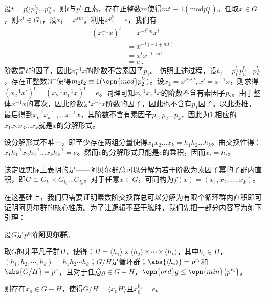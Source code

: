 设$t=p_2^{l_2}p_3^{l_3}...p_k^{l_k}$，则$t$与$p_1^{l_1}$互素，存在正整数$m$使得$mt\equiv 1(\mathrm {mod} p_1^{l_1})$。任取$x\in G$，则$x^t\in G_1$，设$x_1=x^{tm}$。利用$x^{p_1^{l_1}}=e$，我们有
\begin{equation}
\begin{aligned}
(x_1^{-1}x)^t&=x^{-t^2m}x^t\\
&=x^{-t(-1+mt)}\\
&=x^tx^{-t\cdot mt}\\
&=e~.
\end{aligned}
\end{equation}
阶数是$t$的因子，因此$x_1^{-1}x$的阶数不含素因子$p_1$。
仿照上述过程，设$t_2=p_1^{l_1}p_3^{l_3}...p_k^{l_k}$，存在正整数$\mathbb N^{+}$使得$m_2t_2\equiv 1(\opn{mod}p_2^{l_2})$。设$x_2=x'^{t_2m},x'=x^{-1}x$，则求得$(x_2^{-1}x')^t=(x_2^{-1}x_1^{-1}x)^t=e$。同理可知$x_2^{-1}x_1^{-1}x$的阶数不含有素因子$p_2$。由于整体$x^{-1}x$的幂次，因此阶数是$x^{-1}x$阶数的因子，因此也不含有$p_1$因子。以此类推，最后得到$x_k^{-1}x_{k-1}^{-1}...x_1^{-1}x$，其阶数不含有素因子$p_1,p_2...p_k$，因此为1,相应的$x_1x_2x_3...x_k$就是$x$的分解形式。

设分解形式不唯一，即至少存在两组分量使得$x_1x_2...x_k=h_1h_2...h_k$。由交换性得：$x_1h_1^{-1}x_2h_2^{-1}...x_kh_k^{-1}=e$。然而$e$的分解形式只能是$e$的乘积，因而$x_i=h_i$。

该定理实际上表明的是——阿贝尔群总可以分解为若干阶数为素因子幂的子群内直积，即$G\cong G_{l_1}\times G_{l_2}...G_{l_k}$。对于任意$x\in G$，可同构为$f(x)=(x_1,x_2,...,x_k)$。

在这基础上，我们只需要证明素数阶交换群总可以分解为有限个循环群内直积即可证明阿贝尔群的核心性质。为了让逻辑不至于臃肿，我们先把一部分内容写为如下引理：



\begin{lemma}{}

设$G$是$p^n$阶\textbf{阿贝尔群}。

取$G$的非平凡子群$H$，使得：$H=\langle h_1 \rangle\times\langle h_2 \rangle\times\cdots\times\langle h_k \rangle$，其中$h_i\in H$，$(h_1, h_2, \cdots, h_k)=h_1h_2\cdots h_k$；$G/H$是循环群；$\abs{\langle h_i \rangle}=p^{r_i}$和$\abs{G/H}=p^s$，且对于任意$g\in G-H$，$\opn{ord}g\leq \opn{min}\{p^{r_i}\}$。

则存在$x_0\in G-H$，使得$G/H=\langle x_0H \rangle$且$x_0^{p_s}=e$。

\end{lemma}

